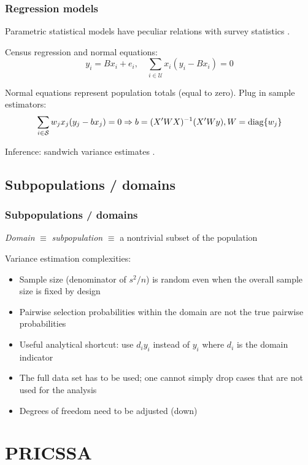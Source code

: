 \documentclass[aspectratio=43]{beamer}
\begin{document}
\begin{frame}\frametitle{Regression models}

Parametric statistical models have peculiar relations with survey statistics
\citep{skinner:1989,binder:roberts:2003,binder:roberts:2009,pfeffermann:2011:whymodel}.

Census regression and normal equations:
$$
y_i = B x_i + e_i, \quad \sum_{i\in\mathcal{U}} x_i (y_i - B x_i) = 0
$$

Normal equations represent population totals (equal to zero). Plug in sample estimators:
$$
\sum_{i\in\mathcal{S}} w_j x_j (y_j - b x_j) = 0 \Rightarrow b = (X'WX)^{-1} (X'Wy), W = {\rm diag}\{ w_j \}
$$

Inference: sandwich variance estimates \citep{fuller:1975,binder:1983}.

\end{frame}

\subsection{Subpopulations / domains}

\begin{frame}\frametitle{Subpopulations / domains}

\textit{Domain} $\equiv$ \textit{subpopulation} $\equiv$ a nontrivial subset of the population

\bigskip

Variance estimation complexities:
\begin{itemize}
    \item Sample size (denominator of $s^2/n$) is random even when the overall sample size is fixed by design
    \item Pairwise selection probabilities within the domain are not the true pairwise probabilities
    \item Useful analytical shortcut: use $d_i y_i$ instead of $y_i$ where $d_i$ is the domain indicator
    \item The full data set has to be used; one cannot simply drop cases that are not used for the analysis
    \item Degrees of freedom need to be adjusted (down)
\end{itemize}

\citet{west:berglund:heeringa:2008}

\end{frame}

\section{PRICSSA}
\end{document}
